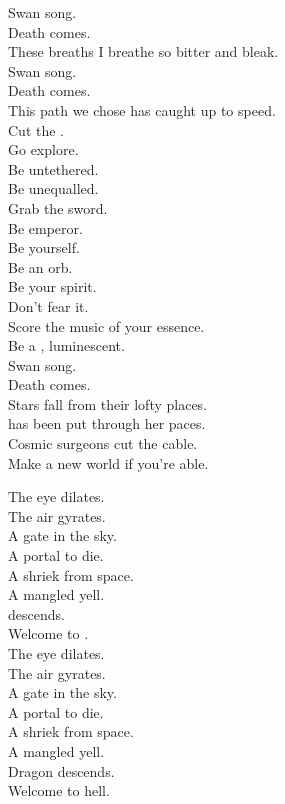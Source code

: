 Swan song. \\
Death comes. \\
These breaths I breathe so bitter and bleak. \\
Swan song. \\
Death comes. \\
This path we chose has caught up to speed. \\

Cut the . \\
Go explore. \\
Be untethered. \\
Be unequalled. \\
Grab the sword. \\
Be emperor. \\
Be yourself. \\
Be an orb. \\
Be your spirit. \\
Don't fear it. \\
Score the music of your essence. \\
Be a , luminescent. \\
Swan song. \\
Death comes. \\

Stars fall from their lofty places. \\
 has been put through her paces. \\
Cosmic surgeons cut the cable. \\
Make a new world if you're able. \\


The eye dilates. \\
The air gyrates. \\
A gate in the sky. \\
A portal to die. \\
A shriek from space. \\
A mangled yell. \\
 descends. \\
Welcome to . \\

The eye dilates. \\
The air gyrates. \\
A gate in the sky. \\
A portal to die. \\
A shriek from space. \\
A mangled yell. \\
Dragon descends. \\
Welcome to hell. \\

